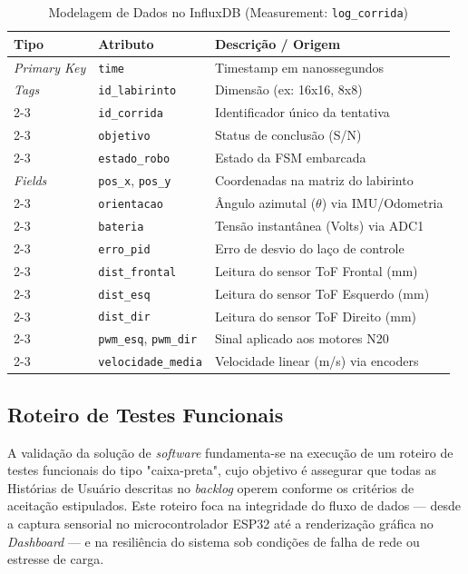 \begin{table}[htbp]
\centering
\caption{Modelagem de Dados no InfluxDB (Measurement: \texttt{log\_corrida})}
\label{tab:schema_influxdb}
\begin{tabular}{|l|l|l|}
\hline
\textbf{Tipo} & \textbf{Atributo} & \textbf{Descrição / Origem} \\ \hline
\textit{Primary Key} & \texttt{time} & Timestamp em nanossegundos \\ \hline
\textit{Tags} & \texttt{id\_labirinto} & Dimensão (ex: 16x16, 8x8) \\ \cline{2-3} 
 & \texttt{id\_corrida} & Identificador único da tentativa \\ \cline{2-3} 
 & \texttt{objetivo} & Status de conclusão (S/N) \\ \cline{2-3} 
 & \texttt{estado\_robo} & Estado da FSM embarcada \\ \hline
\textit{Fields} & \texttt{pos\_x}, \texttt{pos\_y} & Coordenadas na matriz do labirinto \\ \cline{2-3} 
 & \texttt{orientacao} & Ângulo azimutal ($\theta$) via IMU/Odometria \\ \cline{2-3} 
 & \texttt{bateria} & Tensão instantânea (Volts) via ADC1 \\ \cline{2-3} 
 & \texttt{erro\_pid} & Erro de desvio do laço de controle \\ \cline{2-3} 
 & \texttt{dist\_frontal} & Leitura do sensor ToF Frontal (mm) \\ \cline{2-3} 
 & \texttt{dist\_esq} & Leitura do sensor ToF Esquerdo (mm) \\ \cline{2-3} 
 & \texttt{dist\_dir} & Leitura do sensor ToF Direito (mm) \\ \cline{2-3} 
 & \texttt{pwm\_esq}, \texttt{pwm\_dir} & Sinal aplicado aos motores N20 \\ \cline{2-3} 
 & \texttt{velocidade\_media} & Velocidade linear (m/s) via encoders \\ \hline
\end{tabular}
\end{table}

\subsection{Roteiro de Testes Funcionais}

A validação da solução de \textit{software} fundamenta-se na execução de um roteiro de testes funcionais do tipo "caixa-preta", cujo objetivo é assegurar que todas as Histórias de Usuário descritas no \textit{backlog} operem conforme os critérios de aceitação estipulados. Este roteiro foca na integridade do fluxo de dados --- desde a captura sensorial no microcontrolador ESP32 até a renderização gráfica no \textit{Dashboard} --- e na resiliência do sistema sob condições de falha de rede ou estresse de carga.


